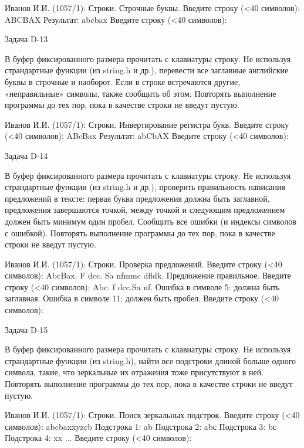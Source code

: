 Иванов И.И. (1057/1): Строки. Строчные буквы.
Введите строку (<40 символов): ABCBAX
Результат: abcbax
Введите строку (<40 символов):


Задача D-13

В буфер фиксированного размера прочитать с клавиатуры строку. Не используя
страндартные функции (из string.h и др.), перевести все заглавные английские
буквы в строчные и наоборот. Если в строке встречаются другие, «неправильные»
символы, также сообщить об этом. Повторять выполнение программы до тех пор,
пока в качестве строки не введут пустую.

Иванов И.И. (1057/1): Строки. Инвертирование регистра букв.
Введите строку (<40 символов): ABcBax
Результат: abCbAX
Введите строку (<40 символов):


Задача D-14

В буфер фиксированного размера прочитать с клавиатуры строку. Не используя
страндартные функции (из string.h и др.), проверить правильность написания
предложений в тексте: первая буква предложения должна быть заглавной,
предложения завершаются точкой, между точкой и следующим предложением должен
быть минимум один пробел. Сообщить все ошибки (и индексы символов с ошибкой).
Повторять выполнение программы до тех пор, пока в качестве строки не введут
пустую.

Иванов И.И. (1057/1): Строки. Проверка предложений.
Введите строку (<40 символов): AbcBax. F dcc. Sa nfmmc dfldk.
Предложение правильное.
Введите строку (<40 символов): Abc. f dcc.Sa nf.
Ошибка в символе 5: должна быть заглавная.
Ошибка в символе 11: должен быть пробел.
Введите строку (<40 символов):


Задача D-15

В буфер фиксированного размера прочитать с клавиатуры строку. Не используя
страндартные функции (из string.h), найти все подстроки длиной больше одного
символа, такие, что зеркальные их отражения тоже присутствуют в ней. Повторять
выполнение программы до тех пор, пока в качестве строки не введут пустую.

Иванов И.И. (1057/1): Строки. Поиск зеркальных подстрок.
Введите строку (<40 символов): abcbaxxyzcb
Подстрока 1: ab
Подстрока 2: abс
Подстрока 3: bс
Подстрока 4: xx
...
Введите строку (<40 символов):

